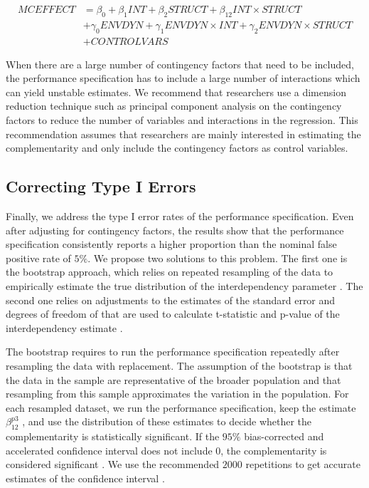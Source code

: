 \documentclass[12pt]{article}
\begin{document}
\begin{align*}
MCEFFECT &= \beta_0 + \beta_1 INT + \beta_2 STRUCT + \beta_{12} INT \times STRUCT \\
&+\gamma_0 ENVDYN + \gamma_1 ENVDYN \times INT + \gamma_2 ENVDYN\times STRUCT \\
&+ CONTROLVARS 
\end{align*}

When there are a large number of contingency factors that need to be included, the performance specification has to include a large number of interactions which can yield unstable estimates. We recommend that researchers use a dimension reduction technique such as principal component analysis on the contingency factors to reduce the number of variables and interactions in the regression. This recommendation assumes that researchers are mainly interested in estimating the complementarity and only include the contingency factors as control variables.

\subsection{Correcting Type I Errors}

Finally, we address the type I error rates of the performance specification. Even after adjusting for contingency factors, the results show that the performance specification consistently reports a higher proportion than the nominal false positive rate of $5\%$. We propose two solutions to this problem. The first one is the bootstrap approach, which relies on repeated resampling of the data to empirically estimate the true distribution of the interdependency parameter \citep{efron_computer_2017}. The second one relies on adjustments to the estimates of the standard error and degrees of freedom of that are used to calculate t-statistic and p-value of the interdependency estimate \citep{young_improved_2016}.

The bootstrap requires to run the performance specification repeatedly after resampling the data with replacement. The assumption of the bootstrap is that the data in the sample are representative of the broader population and that resampling from this sample approximates the variation in the population. For each resampled dataset, we run the performance specification, keep the estimate $\beta_{12}^{p3}$ , and use the distribution of these estimates to decide whether the complementarity is statistically significant. If the $95\%$ bias-corrected and accelerated confidence interval does not include $0$, the complementarity is considered significant \citep{efron_computer_2017}. We use the recommended $2000$ repetitions to get accurate estimates of the confidence interval \citep{efron_computer_2017}. 
\end{document}
